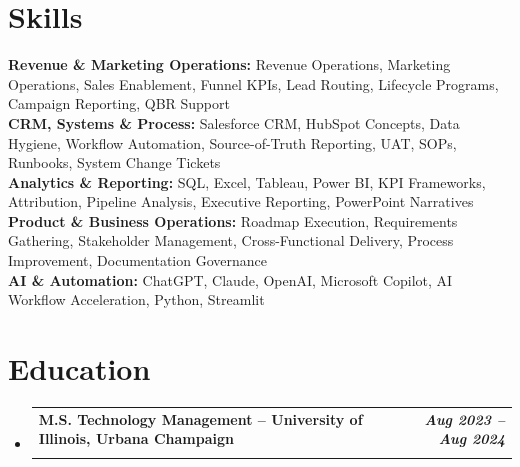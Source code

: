 \documentclass[letterpaper,10pt]{article}
\makeatletter
\newcommand{\resumeSubheading}[4]{
  \vspace{1pt}\item
    \begin{tabular*}{1.0\textwidth}[t]{l@{\extracolsep{\fill}}r}
      \textbf{#1} & \textbf{\small #2} \\
      \textit{\small #3} & \textit{\small #4} \\
    \end{tabular*}\vspace{-6pt}
}
\newcommand{\resumeSubHeadingListStart}{\begin{itemize}[leftmargin=0.0in, label={}]}
\newcommand{\resumeSubHeadingListEnd}{\end{itemize}}
\makeatother
\begin{document}
\section{Skills}
\begin{itemize}[leftmargin=0.0in, label={}]
    \small{\item{
    \textbf{Revenue \& Marketing Operations:} Revenue Operations, Marketing Operations, Sales Enablement, Funnel KPIs, Lead Routing, Lifecycle Programs, Campaign Reporting, QBR Support \\
    \textbf{CRM, Systems \& Process:} Salesforce CRM, HubSpot Concepts, Data Hygiene, Workflow Automation, Source-of-Truth Reporting, UAT, SOPs, Runbooks, System Change Tickets \\
    \textbf{Analytics \& Reporting:} SQL, Excel, Tableau, Power BI, KPI Frameworks, Attribution, Pipeline Analysis, Executive Reporting, PowerPoint Narratives \\
    \textbf{Product \& Business Operations:} Roadmap Execution, Requirements Gathering, Stakeholder Management, Cross-Functional Delivery, Process Improvement, Documentation Governance \\
    \textbf{AI \& Automation:} ChatGPT, Claude, OpenAI, Microsoft Copilot, AI Workflow Acceleration, Python, Streamlit
    }}
\end{itemize}
\vspace{-10pt}

\section{Education}
  \resumeSubHeadingListStart
\resumeSubheading
      {M.S. Technology Management -- University of Illinois, Urbana Champaign}{\textit{Aug 2023 -- Aug 2024}}
      {}{}
      \vspace{-20pt}
    \resumeSubHeadingListEnd
\end{document}
